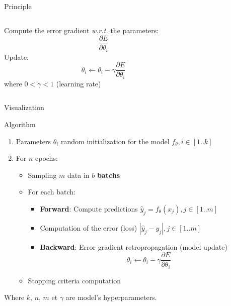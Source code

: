 
\begin{frame}{Principle}
  \begin{columns}
    \begin{column}{0.5\textwidth}
      Compute the error gradient \emph{w.r.t.} the parameters:
      \[
      \frac{\partial{E}}{\partial{\theta_i}}
      \]
      Update:
      \[
        \theta_i \leftarrow \theta_i - \gamma\frac{\partial{E}}{\partial{\theta_i}}
      \]
      where $0 < \gamma < 1$ (learning rate)
    \end{column}
    \begin{column}{0.5\textwidth}
    \end{column}
  \end{columns}
\end{frame}

\begin{frame}{Visualization}
\end{frame}

\begin{frame}{Algorithm}
  \begin{enumerate}
    \item Parameters $\theta_i$ random initialization for the model $f_{\theta}, i\in[1..k]$
    \item For $n$ epochs:
      \begin{itemize}
        \item Sampling $m$ data in $b$ \textbf{batchs}
        \item For each batch:
        \begin{itemize}
          \item \textbf{Forward}: Compute predictions $\hat{y}_j = f_{\theta}(x_j), j\in[1..m]$
          \item Computation of the error (loss) $|\hat{y}_j-y_j|, j\in[1..m]$
          \item \textbf{Backward}: Error gradient retropropagation (model update)
          \[
            \theta_i \leftarrow \theta_i - \gamma\frac{\partial{E}}{\partial{\theta_i}}
          \]
        \end{itemize}
      \item Stopping criteria computation
      \end{itemize}
  \end{enumerate}

  Where $k$, $n$, $m$ et $\gamma$ are model's hyperparameters.
\end{frame}


